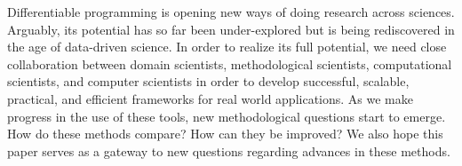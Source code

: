 Differentiable programming is opening new ways of doing research across sciences. Arguably, its potential has so far been under-explored but is being rediscovered in the age of data-driven science. In order to realize its full potential, we need close collaboration between domain scientists, methodological scientists, computational scientists, and computer scientists in order to develop successful, scalable, practical, and efficient frameworks for real world applications.
As we make progress in the use of these tools, new methodological questions start to emerge. 
How do these methods compare? How can they be improved? 
We also hope this paper serves as a gateway to new questions regarding advances in these methods. 

